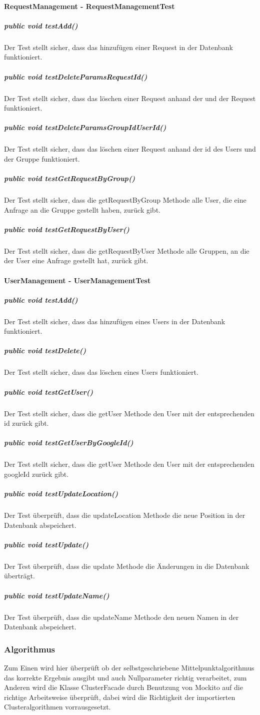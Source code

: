 \documentclass{scrartcl}
\begin{document}
 	\paragraph{RequestManagement - RequestManagementTest}
 	 \subparagraph{    public void testAdd()     }
	Der Test stellt sicher, dass das hinzufügen einer Request in der Datenbank funktioniert.
    \subparagraph{    public void testDeleteParamsRequestId()     }
	Der Test stellt sicher, dass das löschen einer Request anhand der und der Request funktioniert.
    \subparagraph{    public void testDeleteParamsGroupIdUserId()     }
    	Der Test stellt sicher, dass das löschen einer Request anhand der id des Users und der Gruppe funktioniert.
    \subparagraph{    public void testGetRequestByGroup()     }
   	Der Test stellt sicher, dass die getRequestByGroup Methode alle User, die eine Anfrage an die Gruppe gestellt haben, zurück gibt.
    \subparagraph{    public void testGetRequestByUser()    }
   	Der Test stellt sicher, dass die getRequestByUser Methode alle Gruppen, an die der User eine Anfrage gestellt hat, zurück gibt.
   	
	\paragraph{UserManagement - UserManagementTest}
    \subparagraph{    public void testAdd()   }
	Der Test stellt sicher, dass das hinzufügen eines Users in der Datenbank funktioniert.
    \subparagraph{    public void testDelete()   }
	Der Test stellt sicher, dass das löschen eines Users funktioniert.
    \subparagraph{    public void testGetUser()  }
   	Der Test stellt sicher, dass die getUser Methode den User mit der entsprechenden id zurück gibt.
    \subparagraph{ public void testGetUserByGoogleId()     }
   	Der Test stellt sicher, dass die getUser Methode den User mit der entsprechenden googleId zurück gibt.
    \subparagraph{    public void testUpdateLocation()     }
   	Der Test überprüft, dass die updateLocation Methode die neue Position in der Datenbank abspeichert.	
    \subparagraph{    public void testUpdate()     }
   	Der Test überprüft, dass die update Methode die Änderungen in die Datenbank überträgt.	
    \subparagraph{    public void testUpdateName()     }	
   	Der Test überprüft, dass die updateName Methode den neuen Namen in der Datenbank abspeichert.	
   	
   	
	\subsubsection{Algorithmus}
	Zum Einen wird hier überprüft ob der selbstgeschriebene Mittelpunktalgorithmus das korrekte Ergebnis ausgibt und auch Nullparameter richtig verarbeitet, zum Anderen wird die Klasse ClusterFacade durch Benutzung von Mockito auf die richtige Arbeitsweise überprüft, dabei wird die Richtigkeit der importierten Clusteralgorithmen vorrausgesetzt. 
\end{document}

